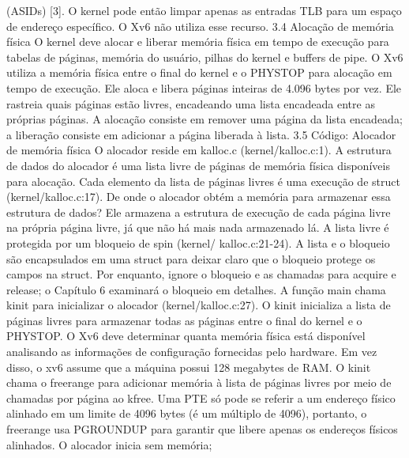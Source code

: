 (ASIDs)  [3].  O  kernel  pode  então  limpar  apenas  as  entradas  TLB  para  um  espaço  de  endereço  específico.  O  Xv6  não  
utiliza  esse  recurso.
 3.4  Alocação  de  memória  física
 O  kernel  deve  alocar  e  liberar  memória  física  em  tempo  de  execução  para  tabelas  de  páginas,  memória  do  usuário,  pilhas  do  kernel  
e  buffers  de  pipe.
 O  Xv6  utiliza  a  memória  física  entre  o  final  do  kernel  e  o  PHYSTOP  para  alocação  em  tempo  de  execução.  Ele  aloca  e  libera  
páginas  inteiras  de  4.096  bytes  por  vez.  Ele  rastreia  quais  páginas  estão  livres,  encadeando  uma  lista  encadeada  entre  as  próprias  
páginas.  A  alocação  consiste  em  remover  uma  página  da  lista  encadeada;  a  liberação  consiste  em  adicionar  a  página  liberada  à  
lista.
 3.5  Código:  Alocador  de  memória  física
 O  alocador  reside  em  kalloc.c  (kernel/kalloc.c:1).  A  estrutura  de  dados  do  alocador  é  uma  lista  livre  de  páginas  de  memória  física  
disponíveis  para  alocação.  Cada  elemento  da  lista  de  páginas  livres  é  uma  execução  de  struct  (kernel/kalloc.c:17).  De  onde  o  
alocador  obtém  a  memória  para  armazenar  essa  estrutura  de  dados?  Ele  armazena  a  estrutura  de  execução  de  cada  página  livre  
na  própria  página  livre,  já  que  não  há  mais  nada  armazenado  lá.  A  lista  livre  é  protegida  por  um  bloqueio  de  spin  (kernel/
 kalloc.c:21-24).  A  lista  e  o  bloqueio  são  encapsulados  em  uma  struct  para  deixar  claro  que  o  bloqueio  protege  os  campos  na  struct.  
Por  enquanto,  ignore  o  bloqueio  e  as  chamadas  para  acquire  e  release;  o  Capítulo  6  examinará  o  bloqueio  em  detalhes.
 A  função  main  chama  kinit  para  inicializar  o  alocador  (kernel/kalloc.c:27).  O  kinit  inicializa  a  lista  de  páginas  livres  para  
armazenar  todas  as  páginas  entre  o  final  do  kernel  e  o  PHYSTOP.  O  Xv6  deve  determinar  quanta  memória  física  está  disponível  
analisando  as  informações  de  configuração  fornecidas  pelo  hardware.  Em  vez  disso,  o  xv6  assume  que  a  máquina  possui  128  
megabytes  de  RAM.  O  kinit  chama  o  freerange  para  adicionar  memória  à  lista  de  páginas  livres  por  meio  de  chamadas  por  página  
ao  kfree.  Uma  PTE  só  pode  se  referir  a  um  endereço  físico  alinhado  em  um  limite  de  4096  bytes  (é  um  múltiplo  de  4096),  portanto,  
o  freerange  usa  PGROUNDUP  para  garantir  que  libere  apenas  os  endereços  físicos  alinhados.  O  alocador  inicia  sem  memória;  
